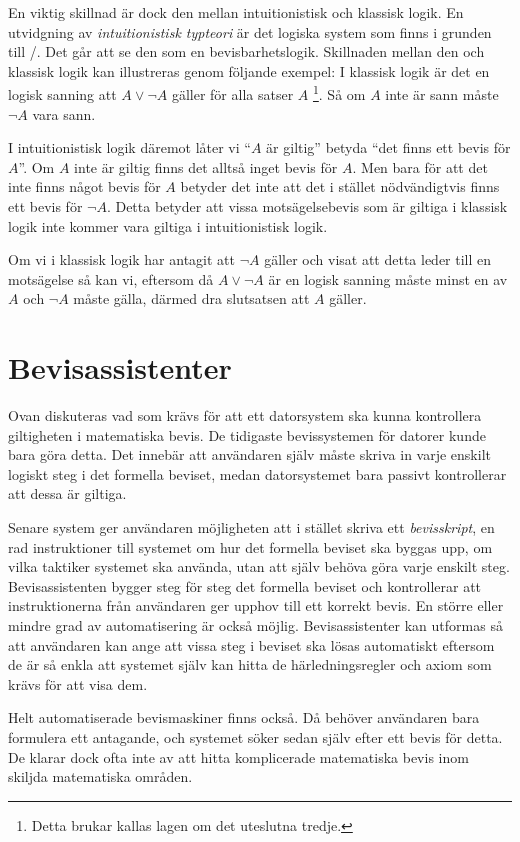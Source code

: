 En viktig skillnad är dock den mellan intuitionistisk och klassisk logik. En
utvidgning av \emph{intuitionistisk typteori}\cite{martin1984intuitionistic} är
det logiska system som finns i grunden till
\coq/\ssr\cite{bertot2004interactive}. Det går att se den som en
bevisbarhetslogik. Skillnaden mellan den och klassisk logik kan illustreras
genom följande exempel: I klassisk logik är det en logisk sanning att $A \lor
\neg A$ gäller för alla satser $A$ \footnote{Detta brukar kallas lagen om det
uteslutna tredje.}. Så om $A$ inte är sann måste $\neg A$ vara
sann\cite{bennet2004forsta}.

I intuitionistisk logik däremot låter vi ``$A$ är giltig'' betyda ``det finns
ett bevis för $A$''. Om $A$ inte är giltig finns det alltså inget bevis för
$A$. Men bara för att det inte finns något bevis för $A$ betyder det inte att
det i stället nödvändigtvis finns ett bevis för $\neg A$. Detta betyder att
vissa motsägelsebevis som är giltiga i klassisk logik inte kommer vara giltiga
i intuitionistisk logik\cite{barendregt2001proofdependent}.

Om vi i klassisk logik har antagit att $\neg A$ gäller och visat att detta
leder till en motsägelse så kan vi, eftersom då $A \lor \neg A$ är en logisk
sanning måste minst en av $A$ och $\neg A$ måste gälla, därmed dra slutsatsen
att $A$ gäller.

\section{Bevisassistenter}
Ovan diskuteras vad som krävs för att ett datorsystem ska kunna kontrollera
giltigheten i matematiska bevis. De tidigaste bevissystemen för datorer kunde
bara göra detta. Det innebär att användaren själv måste skriva in varje enskilt
logiskt steg i det formella beviset, medan datorsystemet bara passivt
kontrollerar att dessa är giltiga.

Senare system ger användaren möjligheten att i stället skriva ett
\emph{bevisskript}, en rad instruktioner till systemet om hur det formella
beviset ska byggas upp, om vilka taktiker systemet ska använda, utan att själv
behöva göra varje enskilt steg. Bevisassistenten bygger steg för steg det
formella beviset och kontrollerar att instruktionerna från användaren ger
upphov till ett korrekt bevis. En större eller mindre grad av automatisering är
också möjlig. Bevisassistenter kan utformas så att användaren kan ange att
vissa steg i beviset ska lösas automatiskt eftersom de är så enkla att
systemet själv kan hitta de härledningsregler och axiom som krävs för att visa
dem.

Helt automatiserade bevismaskiner finns också. Då behöver användaren bara
formulera ett antagande, och systemet söker sedan själv efter ett bevis för
detta. De klarar dock ofta inte av att hitta komplicerade matematiska bevis
inom skiljda matematiska områden\cite{proofassistants}.
